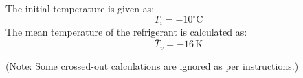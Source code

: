The initial temperature is given as:  
\[
T_i = -10^\circ\text{C}
\]  
The mean temperature of the refrigerant is calculated as:  
\[
\bar{T}_v = -16 \, \text{K}
\]  

(Note: Some crossed-out calculations are ignored as per instructions.)